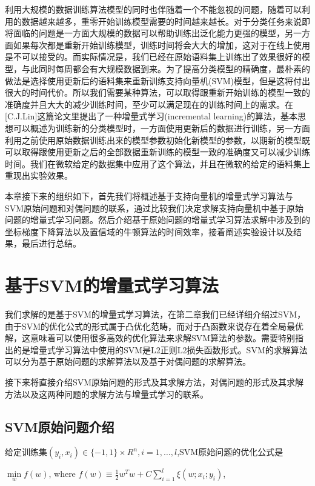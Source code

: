 \documentclass[master]{njuthesis}
\begin{document}
   利用大规模的数据训练算法模型的同时也伴随着一个不能忽视的问题，随着可以利用的数据越来越多，重零开始训练模型需要的时间越来越长。对于分类任务来说即将面临的问题是一方面大规模的数据可以帮助训练出泛化能力更强的模型，另一方面如果每次都是重新开始训练模型，训练时间将会大大的增加，这对于在线上使用是不可以接受的。而实际情况是，我们已经在原始语料集上训练出了效果很好的模型，与此同时每周都会有大规模数据到来。为了提高分类模型的精确度，最朴素的做法是选择使用更新后的语料集来重新训练支持向量机(SVM)模型，但是这将付出很大的时间代价。所以我们需要某种算法，可以取得跟重新开始训练的模型一致的准确度并且大大的减少训练时间，至少可以满足现在的训练时间上的需求。在[C.J.Lin]\cite{incremental}这篇论文里提出了一种增量式学习(incremental learning)的算法，基本思想可以概述为训练新的分类模型时，一方面使用更新后的数据进行训练，另一方面利用之前使用原始数据训练出来的模型参数初始化新模型的参数，以期新的模型既可以取得跟使用更新之后的全部数据重新训练的模型一致的准确度又可以减少训练时间。我们在微软给定的数据集中应用了这个算法，并且在微软的给定的语料集上重现出实验效果。

   本章接下来的组织如下，首先我们将概述基于支持向量机的增量式学习算法与SVM原始问题和对偶问题的联系，通过比较我们决定求解支持向量机中基于原始问题的增量式学习问题。然后介绍基于原始问题的增量式学习算法求解中涉及到的坐标梯度下降算法以及置信域的牛顿算法的时间效率，接着阐述实验设计以及结果，最后进行总结。

\section{基于SVM的增量式学习算法}

    我们求解的是基于SVM的增量式学习算法\cite{incremental}，在第二章我们已经详细介绍过SVM，由于SVM的优化公式的形式属于凸优化范畴，而对于凸函数来说存在着全局最优解，这意味着可以使用很多高效的优化算法来求解SVM算法的参数。需要特别指出的是增量式学习算法中使用的SVM是L2正则L2损失函数形式。SVM的求解算法可以分为基于原始问题的求解算法以及基于对偶问题的求解算法。

    接下来将直接介绍SVM原始问题的形式及其求解方法，对偶问题的形式及其求解方法以及这两种问题的求解方法与增量式学习的联系。

\subsection{SVM原始问题介绍}

    给定训练集$\left(y_i,x_i\right) \in \{-1, 1\} \times R^n, i = 1,\dots,l$,SVM原始问题的优化公式是

    $\min\limits_{w} f\left(w\right)$, where $f\left(w\right)\equiv \frac{1}{2}w^Tw + C\sum_{i=1}^l \xi\left(w;x_i;y_i\right)$, 
\end{document}
